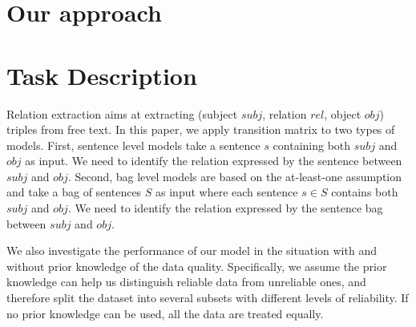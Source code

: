 \section{Our approach}
\section{Task Description}
Relation extraction aims at extracting (subject $subj$, relation $rel$, object $obj$) triples from free text. In this paper, we apply transition matrix to two types of models. First, sentence level models take a sentence $s$ containing both $subj$ and $obj$ as input. We need to identify the relation expressed by the sentence between $subj$ and $obj$. Second, bag level models are based on the at-least-one assumption and take a bag of sentences $S$ as input where each sentence $s\in S$ contains both $subj$ and $obj$. We need to identify the relation expressed by the sentence bag between $subj$ and $obj$.

We also investigate the performance of our model in the situation with and without prior knowledge of the data quality. Specifically, we assume the prior knowledge can help us distinguish reliable data from unreliable ones, and therefore split the dataset into several subsets with different levels of reliability. If no prior knowledge can be used, all the data are treated equally. 



